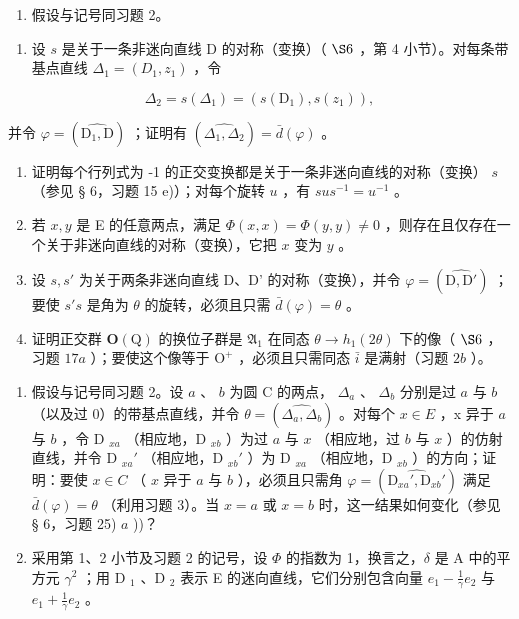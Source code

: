 \begin{enumerate}
\def\labelenumi{\arabic{enumi})}
\setcounter{enumi}{2}
\tightlist
\item
  假设与记号同习题 2。
\end{enumerate}

\begin{enumerate}
\def\labelenumi{\alph{enumi})}
\tightlist
\item
  设 \(s\) 是关于一条非迷向直线 D 的对称（变换）（ \(\S 6\) ，第 4 小节）。对每条带基点直线 \(\Delta_{1} = (D_{1}, z_{1})\) ，令
\end{enumerate}

\[
\Delta_ {2} = s (\Delta_ {1}) = (s (\mathrm{D} _ {1}), s (z _ {1})),
\]

并令 \(\varphi = (\widehat{\mathrm{D}_1, \mathrm{D}})\) ；证明有 \((\widehat{\Delta_1, \Delta_2}) = \bar{d}(\varphi)\) 。

\begin{enumerate}
\def\labelenumi{\alph{enumi})}
\setcounter{enumi}{1}
\item
  证明每个行列式为 -1 的正交变换都是关于一条非迷向直线的对称（变换） \(s\) （参见 § 6，习题 15 e)）；对每个旋转 \(u\) ，有 \(sus^{-1} = u^{-1}\) 。
\item
  若 \(x, y\) 是 E 的任意两点，满足 \(\Phi(x, x) = \Phi(y, y) \neq 0\) ，则存在且仅存在一个关于非迷向直线的对称（变换），它把 \(x\) 变为 \(y\) 。
\item
  设 \(s, s'\) 为关于两条非迷向直线 D、D' 的对称（变换），并令 \(\varphi = (\widehat{\mathrm{D},\mathrm{D}'})\) ；要使 \(s's\) 是角为 \(\theta\) 的旋转，必须且只需 \(\bar{d}(\varphi) = \theta\) 。
\item
  证明正交群 \(\mathbf{O}(\mathrm{Q})\) 的换位子群是 \(\mathfrak{A}_{1}\) 在同态 \(\theta \to h_{1}(2\theta)\) 下的像（ \(\S 6\) ，习题 \(17a\) ）；要使这个像等于 \(\mathrm{O}^{+}\) ，必须且只需同态 \(\bar{i}\) 是满射（习题 \(2b\) ）。
\end{enumerate}

\begin{enumerate}
\def\labelenumi{\arabic{enumi})}
\setcounter{enumi}{3}
\item
  假设与记号同习题 2。设 \(a\) 、 \(b\) 为圆 C 的两点， \(\Delta_{a}\) 、 \(\Delta_{b}\) 分别是过 \(a\) 与 \(b\) （以及过 0）的带基点直线，并令 \(\theta = (\widehat{\Delta_{a}, \Delta_{b}})\) 。对每个 \(x \in E\) ，x 异于 \(a\) 与 \(b\) ，令 D \(_{xa}\) （相应地，D \(_{xb}\) ）为过 \(a\) 与 \(x\) （相应地，过 \(b\) 与 \(x\) ）的仿射直线，并令 D \(_{xa}'\) （相应地，D \(_{xb}'\) ）为 D \(_{xa}\) （相应地，D \(_{xb}\) ）的方向；证明：要使 \(x \in C\) （ \(x\) 异于 \(a\) 与 \(b\) ），必须且只需角 \(\varphi = (\widehat{\mathrm{D}_{xa}', \mathrm{D}_{xb}'})\) 满足 \(\bar{d}(\varphi) = \theta\) （利用习题 3）。当 \(x = a\) 或 \(x = b\) 时，这一结果如何变化（参见 § 6，习题 25) \(a\) ))？
\item
  采用第 1、2 小节及习题 2 的记号，设 \(\Phi\) 的指数为 1，换言之，\(\delta\) 是 A 中的平方元 \(\gamma^{2}\) ；用 D \(_{1}\) 、D \(_{2}\) 表示 E 的迷向直线，它们分别包含向量 \(e_{1}-\frac{1}{\gamma}e_{2}\) 与 \(e_{1}+\frac{1}{\gamma}e_{2}\) 。
\end{enumerate}

